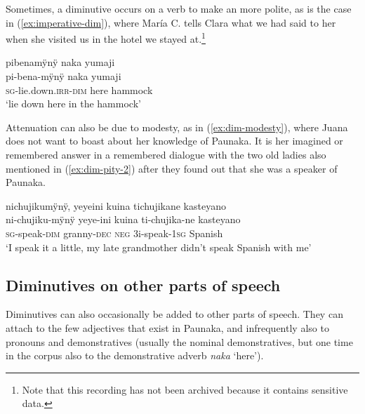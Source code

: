 Sometimes, a diminutive occurs on a verb to make an  more polite, as is the case in (\ref{ex:imperative-dim}), where María C. tells Clara what we had said to her when she visited us in the hotel we stayed at.\footnote{Note that this recording has not been archived because it contains sensitive data.}

\ea\label{ex:imperative-dim}
\begingl
\glpreamble pibenamÿnÿ naka yumaji\\
\gla pi-bena-mÿnÿ naka yumaji\\
\textsc{sg}-lie.down.\textsc{irr}-\textsc{dim} here hammock\\
\glft ‘lie down here in the hammock’
\endgl
\trailingcitation{[cux-c120510l-1.141]}
\xe

Attenuation can also be due to modesty, as in (\ref{ex:dim-modesty}), where Juana does not want to boast about her knowledge of Paunaka. It is her imagined or remembered answer in a remembered dialogue with the two old ladies also mentioned in (\ref{ex:dim-pity-2}) after they found out that she was a speaker of Paunaka.

\ea\label{ex:dim-modesty}
\begingl 
\glpreamble nichujikumÿnÿ, yeyeini kuina tichujikane kasteyano\\
\gla ni-chujiku-mÿnÿ yeye-ini kuina ti-chujika-ne kasteyano\\ 
\textsc{sg}-speak-\textsc{dim} granny-\textsc{dec} \textsc{neg} 3i-speak-1\textsc{sg} Spanish\\ 
\glft ‘I speak it a little, my late grandmother didn’t speak Spanish with me’\\ 
\endgl
\trailingcitation{[jxx-p120515l-1.166]}
\xe





\subsection{Diminutives on other parts of speech}\label{sec:Diminuitves_OtherPOS}

Diminutives can also occasionally be added to other parts of speech. They can attach to the few adjectives that exist in Paunaka, and infrequently also to pronouns and demonstratives (usually the nominal demonstratives, but one time in the corpus also to the demonstrative adverb \textit{naka} ‘here’).

